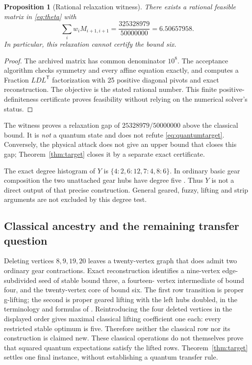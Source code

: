 \documentclass[11pt,a4paper]{article}
\newtheorem{proposition}[theorem]{Proposition}
\theoremstyle{remark}\newtheorem{remark}[theorem]{Remark}
\begin{document}
\begin{proposition}[Rational relaxation witness]\label{prop:theta}
There exists a rational feasible matrix in \eqref{eq:theta} with
\[
 \sum_iw_iM_{i+1,i+1}=\frac{325328979}{50000000}=6.50657958.
\]
In particular, this relaxation cannot certify the bound six.
\end{proposition}
\begin{proof}
The archived matrix has common denominator $10^8$. The acceptance
algorithm checks symmetry and every affine equation exactly, and
computes a Fraction $LDL^{\mathsf T}$ factorization with 25 positive
diagonal pivots and exact reconstruction. The objective is the stated
rational number. This finite positive-definiteness certificate proves
feasibility without relying on the numerical solver's status.
\end{proof}
The witness proves a relaxation gap of $25328979/50000000$ above the
classical bound. It is \emph{not} a quantum state and does not refute
\eqref{eq:quantumtarget}. Conversely, the physical attack does not
give an upper bound that closes this gap; Theorem~\ref{thm:target}
closes it by a separate exact certificate.

The exact degree histogram of $Y$ is
$\{4:2,6:12,7:4,8:6\}$. In ordinary basic gear composition the two
unattached gear hubs have degree five \cite{gear}. Thus $Y$ is not a
direct output of that precise construction. General geared, fuzzy,
lifting and strip arguments are not excluded by this degree test.

\subsection{Classical ancestry and the remaining transfer question}
Deleting vertices $8,9,19,20$ leaves a twenty-vertex graph that does
admit two ordinary gear contractions. Exact reconstruction identifies
a nine-vertex edge-subdivided seed of stable bound three, a fourteen-
vertex intermediate of bound four, and the twenty-vertex core of bound
six. The first row transition is proper g-lifting; the second is proper
geared lifting with the left hubs doubled, in the terminology and
formulas of \cite[Definitions 2.4 and 2.7]{gear}. Reintroducing the four
deleted vertices in the displayed order gives maximal classical lifting
coefficient one each: every restricted stable optimum is five.
Therefore neither the classical row nor its construction is claimed new.
These classical operations do not themselves prove that squared quantum
expectations satisfy the lifted rows. Theorem~\ref{thm:target} settles
one final instance, without establishing a quantum transfer rule.
\end{document}
